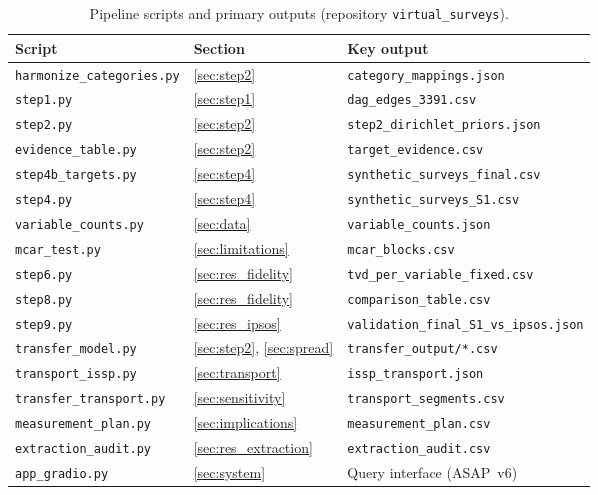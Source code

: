 \begin{table}[H]
\centering
\caption{Pipeline scripts and primary outputs (repository \texttt{virtual\_surveys}).\label{tab:scripts}}
\small
\begin{tabular}{lll}
\toprule
\textbf{Script} & \textbf{Section} & \textbf{Key output} \\
\midrule
\texttt{harmonize\_categories.py} & \ref{sec:step2}        & \texttt{category\_mappings.json} \\
\texttt{step1.py}                 & \ref{sec:step1}        & \texttt{dag\_edges\_3391.csv} \\
\texttt{step2.py}                 & \ref{sec:step2}        & \texttt{step2\_dirichlet\_priors.json} \\
\texttt{evidence\_table.py}       & \ref{sec:step2}        & \texttt{target\_evidence.csv} \\
\texttt{step4b\_targets.py}       & \ref{sec:step4}        & \texttt{synthetic\_surveys\_final.csv} \\
\texttt{step4.py}                 & \ref{sec:step4}        & \texttt{synthetic\_surveys\_S1.csv} \\
\texttt{variable\_counts.py}      & \ref{sec:data}         & \texttt{variable\_counts.json} \\
\texttt{mcar\_test.py}           & \ref{sec:limitations}  & \texttt{mcar\_blocks.csv} \\
\texttt{step6.py}                 & \ref{sec:res_fidelity} & \texttt{tvd\_per\_variable\_fixed.csv} \\
\texttt{step8.py}                 & \ref{sec:res_fidelity} & \texttt{comparison\_table.csv} \\
\texttt{step9.py}                 & \ref{sec:res_ipsos}    & \texttt{validation\_final\_S1\_vs\_ipsos.json} \\
\texttt{transfer\_model.py}       & \ref{sec:step2}, \ref{sec:spread} & \texttt{transfer\_output/*.csv} \\
\texttt{transport\_issp.py}       & \ref{sec:transport}    & \texttt{issp\_transport.json} \\
\texttt{transfer\_transport.py}   & \ref{sec:sensitivity}  & \texttt{transport\_segments.csv} \\
\texttt{measurement\_plan.py}     & \ref{sec:implications} & \texttt{measurement\_plan.csv} \\
\texttt{extraction\_audit.py}     & \ref{sec:res_extraction} & \texttt{extraction\_audit.csv} \\
\texttt{app\_gradio.py}           & \ref{sec:system}       & Query interface (ASAP~v6) \\
\bottomrule
\end{tabular}
\end{table}

